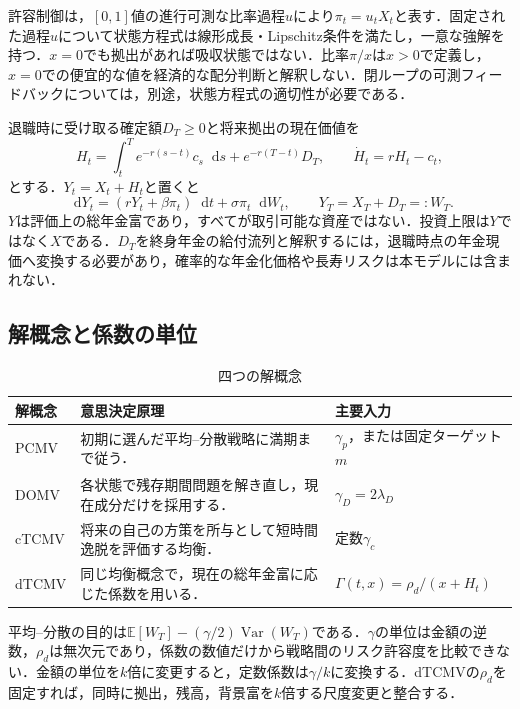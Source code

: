 \documentclass[10pt,a4paper]{article}
\numberwithin{equation}{section}
\numberwithin{table}{section}
\numberwithin{figure}{section}
\theoremstyle{plain}
\theoremstyle{definition}
\newcommand{\E}{\mathbb{E}}
\DeclareMathOperator{\Var}{Var}
\newcommand{\dd}{\mathop{}\!\mathrm{d}}
\begin{document}
許容制御は，$[0,1]$値の進行可測な比率過程$u$により$\pi_t=u_tX_t$と表す．固定された過程$u$について状態方程式は線形成長・Lipschitz条件を満たし，一意な強解を持つ．$x=0$でも拠出があれば吸収状態ではない．比率$\pi/x$は$x>0$で定義し，$x=0$での便宜的な値を経済的な配分判断と解釈しない．閉ループの可測フィードバックについては，別途，状態方程式の適切性が必要である．

退職時に受け取る確定額$D_T\geq0$と将来拠出の現在価値を
\begin{equation}
H_t=\int_t^T e^{-r(s-t)}c_s\dd s+e^{-r(T-t)}D_T,
\qquad \dot H_t=rH_t-c_t,
\label{eq:H}
\end{equation}
とする．$Y_t=X_t+H_t$と置くと
\begin{equation}
\dd Y_t=(rY_t+\beta\pi_t)\dd t+\sigma\pi_t\dd W_t,
\qquad Y_T=X_T+D_T=:W_T.
\label{eq:Y}
\end{equation}
$Y$は評価上の総年金富であり，すべてが取引可能な資産ではない．投資上限は$Y$ではなく$X$である．$D_T$を終身年金の給付流列と解釈するには，退職時点の年金現価へ変換する必要があり，確率的な年金化価格や長寿リスクは本モデルには含まれない．

\subsection{解概念と係数の単位}
\begin{table}[htbp]\centering\small
\caption{四つの解概念}\label{tab:concepts}
\begin{tabularx}{\textwidth}{p{17mm}X p{39mm}}
\toprule 解概念 & 意思決定原理 & 主要入力 \\ \midrule
PCMV & 初期に選んだ平均--分散戦略に満期まで従う． & $\gamma_p$，または固定ターゲット$m$ \\
DOMV & 各状態で残存期間問題を解き直し，現在成分だけを採用する． & $\gamma_D=2\lambda_D$ \\
cTCMV & 将来の自己の方策を所与として短時間逸脱を評価する均衡． & 定数$\gamma_c$ \\
dTCMV & 同じ均衡概念で，現在の総年金富に応じた係数を用いる． & $\Gamma(t,x)=\rho_d/(x+H_t)$ \\
\bottomrule\end{tabularx}\end{table}
平均--分散の目的は$\E[W_T]-(\gamma/2)\Var(W_T)$である．$\gamma$の単位は金額の逆数，$\rho_d$は無次元であり，係数の数値だけから戦略間のリスク許容度を比較できない．金額の単位を$k$倍に変更すると，定数係数は$\gamma/k$に変換する．dTCMVの$\rho_d$を固定すれば，同時に拠出，残高，背景富を$k$倍する尺度変更と整合する．
\end{document}
